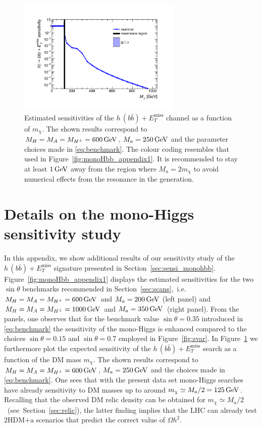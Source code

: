 \documentclass[a4paper, 11pt,notoc]{article}
\newcommand{\MET}{\ensuremath{E_T^\mathrm{miss}}\xspace}
\newcommand{\mA}{\ensuremath{M_{A}}\xspace}
\newcommand{\ma}{\ensuremath{M_{a}}\xspace}
\newcommand{\mH}{\ensuremath{M_{H}}\xspace}
\newcommand{\mHc}{\ensuremath{M_{H^{\pm}}}\xspace}
\newcommand{\hdma}{\ensuremath{\textrm{2HDM+a}}\xspace}
\begin{document}
\begin{figure}[t!]
\centering
\includegraphics[width=0.7\textwidth]{monoHbb_sensi_mDM_scan_red.pdf}
\vspace{-2mm}
\caption{Estimated sensitivities of  the $h \, (b \bar b)+\MET$ channel as a function of $m_\chi$. The shown results correspond to $\mH = \mA = \mHc = 600 \, {\rm GeV}$, $\ma = 250 \, {\rm GeV}$ and the parameter choices made in \eqref{eq:benchmark}. The colour coding resembles that used in Figure~\ref{fig:monoHbb_appendix1}. It is recommended to stay at least $1 \, {\rm GeV}$ away from the region where $\ma = 2 m_\chi$ to avoid numerical effects from the resonance in the generation. }
\label{fig:monoHbb_appendix2}
\end{figure}

\section{Details on the mono-Higgs sensitivity study}
\label{app:extramonoh}

In this appendix, we  show additional results  of our sensitivity study of the $h \, (b \bar b)+\MET$ signature presented in Section~\ref{sec:sensi_monohbb}. Figure~\ref{fig:monoHbb_appendix1} displays the estimated sensitivities for the two $\sin \theta$ benchmarks recommended in Section~\ref{sec:scans},~i.e.~$\mH = \mA = \mHc = 600 \, {\rm GeV}$ and $\ma = 200 \, {\rm GeV}$ (left panel) and $\mH = \mA = \mHc = 1000 \, {\rm GeV}$ and $\ma = 350 \, {\rm GeV}$~(right panel). From the panels, one observes that for the benchmark value $\sin \theta = 0.35$ introduced in \eqref{eq:benchmark} the sensitivity of the mono-Higgs is enhanced compared to the choices  $\sin \theta = 0.15$ and  $\sin \theta = 0.7$ employed in Figure~\ref{fig:svar}. In Figure~\ref{fig:monoHbb_appendix2} we furthermore  plot the expected sensitivity of the $h \, (b \bar b)+\MET$ search as a function of the DM mass $m_\chi$. The shown results correspond to $\mH = \mA = \mHc = 600 \, {\rm GeV}$, $\ma = 250 \, {\rm GeV}$ and the choices made in \eqref{eq:benchmark}. One sees that with the present data set mono-Higgs searches have already sensitivity to DM masses up to around $m_\chi \simeq \ma/2 = 125 \, {\rm GeV}$. Recalling that the  observed DM relic density can be obtained for $m_\chi \simeq \ma/2$ ~(see~Section~\ref{sec:relic}), the latter finding implies that the LHC can already test  \hdma scenarios that predict the correct value of $\Omega h^2$. 



\end{document}
